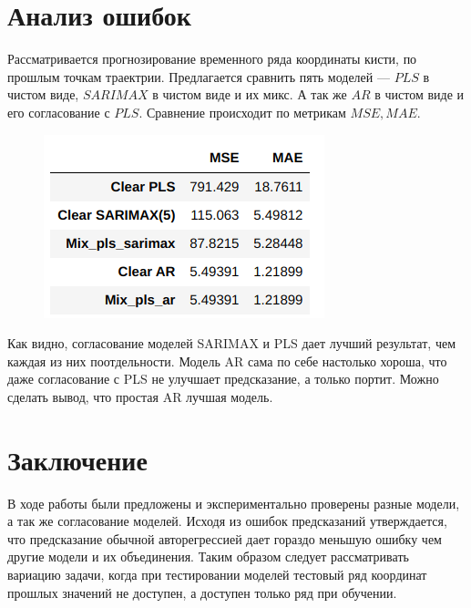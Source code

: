 \documentclass{article}
\begin{document}
\section{Анализ ошибок}
Рассматривается прогнозирование временного ряда координаты кисти, по прошлым точкам траектрии. Предлагается сравнить пять моделей --- $PLS$ в чистом виде, $SARIMAX$ в чистом виде и их микс. А так же $AR$ в чистом виде и его согласование с $PLS$. Сравнение происходит по метрикам $MSE, MAE$.
\begin{figure}[H]
\includegraphics[scale=1]{images/7.png}
\end{figure}
Как видно, согласование моделей SARIMAX и PLS дает лучший результат, чем каждая из них поотдельности. Модель AR сама по себе настолько хороша, что даже согласование с PLS не улучшает предсказание, а только портит. Можно сделать вывод, что простая AR лучшая модель.
\section{Заключение}
В ходе работы были предложены и экспериментально проверены разные модели, а так же согласование моделей. Исходя из ошибок предсказаний утверждается, что предсказание обычной авторегрессией дает гораздо меньшую ошибку чем другие модели и их объединения. Таким образом следует рассматривать вариацию задачи, когда при тестировании моделей тестовый ряд координат прошлых значений не доступен, а доступен только ряд при обучении. 


\nocite{*}


\end{document}
